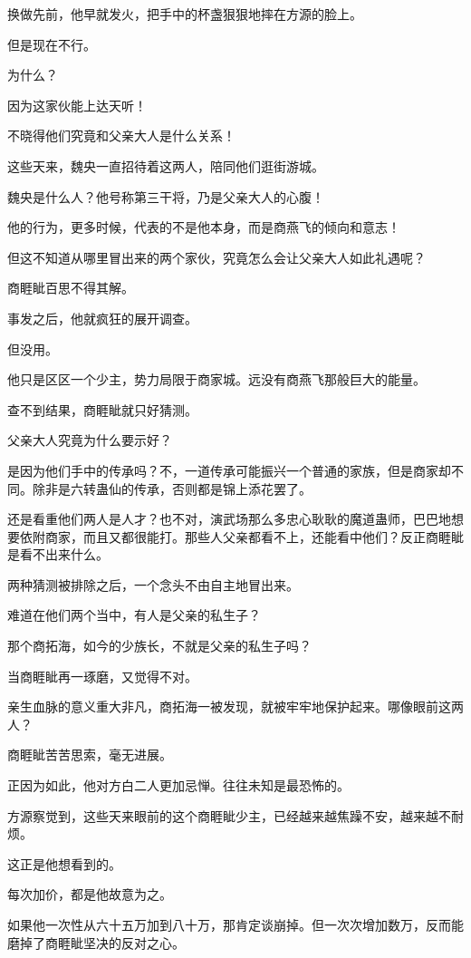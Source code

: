 \begin{this_body}
换做先前，他早就发火，把手中的杯盏狠狠地摔在方源的脸上。

但是现在不行。

为什么？

因为这家伙能上达天听！

不晓得他们究竟和父亲大人是什么关系！

这些天来，魏央一直招待着这两人，陪同他们逛街游城。

魏央是什么人？他号称第三干将，乃是父亲大人的心腹！

他的行为，更多时候，代表的不是他本身，而是商燕飞的倾向和意志！

但这不知道从哪里冒出来的两个家伙，究竟怎么会让父亲大人如此礼遇呢？

商睚眦百思不得其解。

事发之后，他就疯狂的展开调查。

但没用。

他只是区区一个少主，势力局限于商家城。远没有商燕飞那般巨大的能量。

查不到结果，商睚眦就只好猜测。

父亲大人究竟为什么要示好？

是因为他们手中的传承吗？不，一道传承可能振兴一个普通的家族，但是商家却不同。除非是六转蛊仙的传承，否则都是锦上添花罢了。

还是看重他们两人是人才？也不对，演武场那么多忠心耿耿的魔道蛊师，巴巴地想要依附商家，而且又都很能打。那些人父亲都看不上，还能看中他们？反正商睚眦是看不出来什么。

两种猜测被排除之后，一个念头不由自主地冒出来。

难道在他们两个当中，有人是父亲的私生子？

那个商拓海，如今的少族长，不就是父亲的私生子吗？

当商睚眦再一琢磨，又觉得不对。

亲生血脉的意义重大非凡，商拓海一被发现，就被牢牢地保护起来。哪像眼前这两人？

商睚眦苦苦思索，毫无进展。

正因为如此，他对方白二人更加忌惮。往往未知是最恐怖的。

方源察觉到，这些天来眼前的这个商睚眦少主，已经越来越焦躁不安，越来越不耐烦。

这正是他想看到的。

每次加价，都是他故意为之。

如果他一次性从六十五万加到八十万，那肯定谈崩掉。但一次次增加数万，反而能磨掉了商睚眦坚决的反对之心。


\end{this_body}
